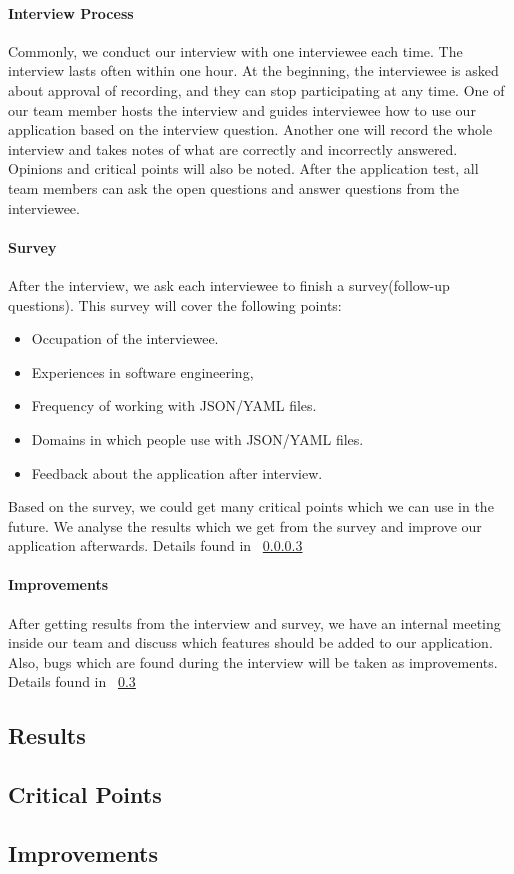 \paragraph{Interview Process}
Commonly, we conduct our interview with one interviewee each time.
The interview lasts often within one hour.
At the beginning, the interviewee is asked about approval of recording, and they can stop participating at any time.
One of our team member hosts the interview and guides interviewee how to use our application based on the interview question.
Another one will record the whole interview and takes notes of what are correctly and incorrectly answered.
Opinions and critical points will also be noted.
After the application test, all team members can ask the open questions and answer questions from the interviewee.

\paragraph{Survey}
After the interview, we ask each interviewee to finish a survey(follow-up questions).
This survey will cover the following points:
\begin{itemize}
    \item Occupation of the interviewee.
    \item Experiences in software engineering,
    \item Frequency of working with JSON/YAML files.
    \item Domains in which people use with JSON/YAML files.
    \item Feedback about the application after interview.
\end{itemize}
Based on the survey, we could get many critical points which we can use in the future.
We analyse the results which we get from the survey and improve our application afterwards.
Details found in ~\ref{improvements}

\paragraph{Improvements}\label{improvements}
After getting results from the interview and survey, we have an internal meeting inside our team and discuss which features should be added to our application.
Also, bugs which are found during the interview will be taken as improvements.
Details found in ~\ref{subsec:improvements}

\subsection{Results}

\subsection{Critical Points}

\subsection{Improvements}\label{subsec:improvements}

